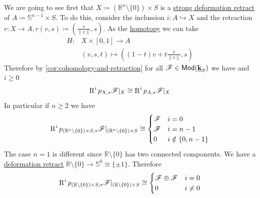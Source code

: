 \documentclass[../../main]{subfiles}
\begin{document}
\begin{example}
  We are going to see first that \(X \coloneq \left( \mathbb{R}^{n} \setminus \{0\} \right) \times S\) is a \hyperref[def:deformation-retract]{strong deformation retract} of \(A \coloneq \mathbb{S}^{n-1} \times S\).
  To do this, consider the inclussion \(i\colon A \hookrightarrow X\) and the retraction \(r\colon X \to A, r(v, s) \coloneq \left( \frac{v}{\lVert v\rVert}, s \right)\).
  As the \hyperref[def:homotopy-over]{homotopy} we can take
  \begin{align*}
    H\colon& X \times [0, 1] \to A \\
    &(v, s, t) \mapsto \left( (1 - t)v + t \frac{v}{\lVert v \rVert}, s \right)
  \end{align*}
  Therefore by \autoref{cor:cohomology-and-retraction} for all \(\mathscr{F} \in \mathsf{Mod}(\underline{\mathbf{k}}_{S})\) we have and \(i \geq 0\)
  \begin{equation*}
    \operatorname{R}^{i}p_{X, \ast}\mathscr{F}|_{X} \cong \operatorname{R}^{i}p_{A, \ast}\mathscr{F}|_{X}
  \end{equation*}
  In particular if \(n \geq 2\) we have
  \begin{equation*}
    \operatorname{R}^{i}p_{\left(\mathbb{R}^{n} \setminus \{0\}\right) \times S, \ast}\mathscr{F}|_{\left( \mathbb{R}^{n} \setminus \{0\} \right) \times S} \cong \begin{cases}
      \mathscr{F} & i = 0 \\
      \mathscr{F} & i = n-1 \\
      0 & i \notin \{0, n-1\}
    \end{cases}
  \end{equation*}
  The case \(n = 1\) is different since \(\mathbb{R} \setminus \{0\}\) has two connected components.
  We have a \hyperref[def:deformation-retract]{deformation retract} \(\mathbb{R} \setminus \{0\} \to \mathbb{S}^{0} \cong \{\pm 1\}\).
  Therefore
  \begin{equation*}
    \operatorname{R}^{i}p_{\left( \mathbb{R} \setminus \{0\} \right) \times S, \ast}\mathscr{F}|_{\left( \mathbb{R} \setminus \{0\} \right) \times S} \cong \begin{cases}
      \mathscr{F} \oplus \mathscr{F} & i = 0 \\
      0 & i \neq 0
    \end{cases}
  \end{equation*}


\end{example}
\end{document}
